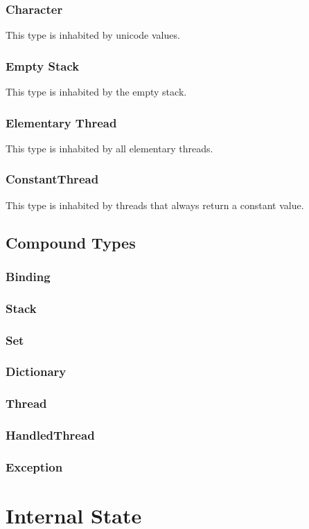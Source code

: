 \documentclass[a4paper]{article}
\begin{document}
\subsubsection{Character}
This type is inhabited by unicode values.
\subsubsection{Empty Stack}
This type is inhabited by the empty stack.
\subsubsection{Elementary Thread}
This type is inhabited by all elementary threads.
\subsubsection{ConstantThread}
This type is inhabited by threads that always return a constant value.

\subsection{Compound Types}
\subsubsection{Binding}
\subsubsection{Stack}
\subsubsection{Set}
\subsubsection{Dictionary}
\subsubsection{Thread}
\subsubsection{HandledThread}
\subsubsection{Exception}


\section{Internal State}
\end{document}
